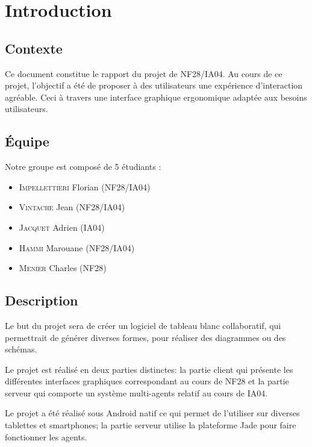 \documentclass[a4paper,11pt]{article}
\begin{document}


\newpage
\section{Introduction}

\subsection{Contexte}
Ce document constitue le rapport du projet de NF28/IA04. Au cours de ce projet, l'objectif a été de proposer à des utilisateurs une expérience d'interaction agréable. Ceci à travers une interface graphique ergonomique adaptée aux besoins utilisateurs.

\subsection{Équipe}
Notre groupe est composé de 5 étudiants :
\begin{itemize}
\item \textsc{Impellettieri} Florian (NF28/IA04)
\item \textsc{Vintache} Jean (NF28/IA04)
\item \textsc{Jacquet} Adrien (IA04)
\item \textsc{Hammi} Marouane (NF28/IA04)
\item \textsc{Menier} Charles (NF28)
\end{itemize}



\subsection{Description}
Le but du projet sera de créer un logiciel de tableau blanc collaboratif, qui permettrait de générer diverses formes, pour réaliser des diagrammes ou des schémas.

Le projet est réalisé en deux parties distinctes: la partie client qui présente les différentes interfaces graphiques correspondant au cours de NF28 et la partie serveur qui comporte un système multi-agents relatif au cours de IA04.

Le projet a été réalisé sous Android natif ce qui permet de l'utiliser sur diverses tablettes et smartphones; la partie serveur utilise la plateforme Jade pour faire fonctionner les agents.



\end{document}
